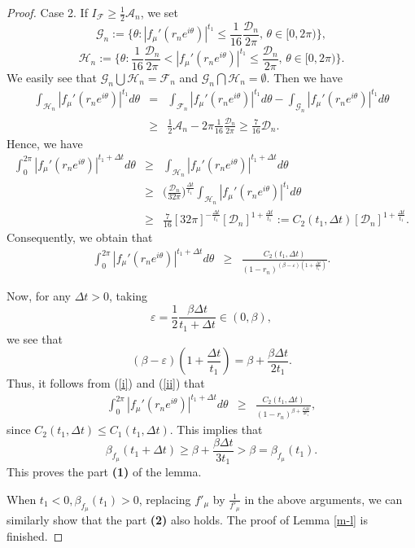 \documentclass[11pt]{amsart}
\theoremstyle{remark}
\theoremstyle{claim}
\theoremstyle{definition}
\theoremstyle{problem}
\theoremstyle{conjecture}
\theoremstyle{question}
\numberwithin{equation}{section}
\begin{document}
\begin{proof}
Case 2. If $I_{\mathcal{F}} \geq \frac{1}{2}\mathcal{A}_n$, we set 
$$\mathcal{G}_n:=\{\theta:  |f_{\mu}'(r_ne^{i\theta})|^{t_1}\leq \frac{1}{16}\frac{\mathcal{D}_n}{2\pi},\, \theta\in [0, 2\pi)\},$$
$${\mathcal{H}_n}:=\{\theta:  \frac{1}{16}\frac{\mathcal{D}_n}{2\pi}<|f_{\mu}'(r_ne^{i\theta})|^{t_1}\leq \frac{\mathcal{D}_n}{2\pi},\,  \theta\in [0, 2\pi)\}.$$
We easily see that $\mathcal{G}_n \bigcup \mathcal{H}_n=\mathcal{F}_n$ and $\mathcal{G}_n \bigcap \mathcal{H}_n=\emptyset.$ Then we have
\begin{eqnarray}
\int_{\mathcal{H}_n}|f_{\mu}'(r_ne^{i\theta})|^{t_1} d\theta&=&\int_{\mathcal{F}_n}|f_{\mu}'(r_ne^{i\theta})|^{t_1} d\theta-\int_{\mathcal{G}_n}|f_{\mu}'(r_ne^{i\theta})|^{t_1} d\theta \nonumber \\
&\geq & \frac{1}{2}\mathcal{A}_n- 2\pi \frac{1}{16}\frac{\mathcal{D}_n}{2\pi}\geq  \frac{7}{16}\mathcal{D}_n. \nonumber
\end{eqnarray}
Hence, we have 
\begin{eqnarray}
\int_{0}^{2\pi}|f_{\mu}'(r_ne^{i\theta})|^{t_1+\Delta t} d\theta &\geq &\int_{\mathcal{H}_n}|f_{\mu}'(r_ne^{i\theta})|^{t_1+\Delta t} d\theta \nonumber \\
&\geq & \Big(\frac{\mathcal{D}_n}{32\pi}\Big)^{\frac{\Delta t}{t_1}}\int_{\mathcal{H}_n}|f_{\mu}'(r_ne^{i\theta})|^{t_1} d\theta \nonumber \\
&\geq & \frac{7}{16}[32\pi]^{-\frac{\Delta t}{t_1}}[\mathcal{D}_n]^{1+\frac{\Delta t}{t_1}}:=C_2(t_1, \Delta t)[\mathcal{D}_n]^{1+\frac{\Delta t}{t_1}}. \nonumber
\end{eqnarray}
Consequently, we obtain that 
\begin{eqnarray}\label{ii}
\int_{0}^{2\pi}|f_{\mu}'(r_ne^{i\theta})|^{t_1+\Delta t} d\theta&\geq  & \frac{ C_2(t_1, \Delta t)}{(1-r_n)^{(\beta-\varepsilon)(1+\frac{\Delta t}{t_1})}}. 
\end{eqnarray}

Now, for any $\Delta t>0$, taking $$\varepsilon=\frac{1}{2}\frac{\beta \Delta t}{t_1+\Delta t}\in (0, \beta),$$ we see that 
$$(\beta-\varepsilon)(1+\frac{\Delta t}{t_1})=\beta+\frac{\beta\Delta t}{2t_1}.$$
Thus, it follows from (\ref{i}) and (\ref{ii}) that 
\begin{eqnarray}\label{iii}
\int_{0}^{2\pi}|f_{\mu}'(r_ne^{i\theta})|^{t_1+\Delta t} d\theta&\geq  & \frac{ C_2(t_1, \Delta t)}{(1-r_n)^{\beta+\frac{\beta \Delta t}{2t_1}}}, \nonumber 
\end{eqnarray}
since $C_2(t_1, \Delta t)\leq C_1(t_1, \Delta t).$ This implies that 
$$\beta_{f_{\mu}}(t_1+\Delta t)\geq \beta+\frac{\beta \Delta t}{3t_1}>\beta=\beta_{f_{\mu}}(t_1).$$
This proves the part {\bf(1)} of the lemma.  

When $t_1<0, \beta_{f_{\mu}}(t_1)>0$, replacing $f'_{\mu}$ by $\frac{1}{f'_{\mu}}$ in the above arguments, we can similarly show that the part {\bf (2)} also holds.  The proof of Lemma \ref{m-l} is finished. 
\end{proof}
\end{document}
